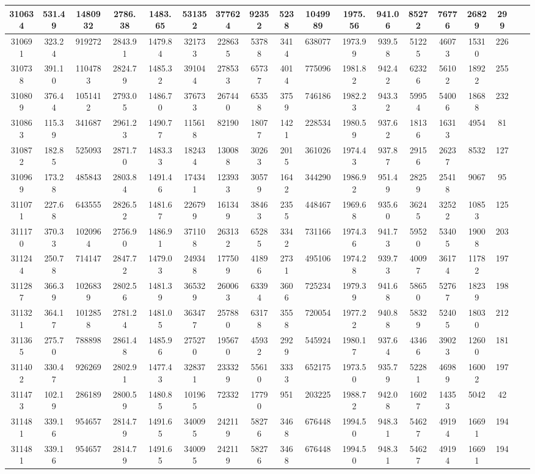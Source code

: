 \documentclass[10pt]{extarticle}
\begin{document}
\begin{longtable}{|c|c|c|c|c|c|c|c|c|c|c|c|c|c|c|c|c|c|}
\hline 
310634&531.49&1480932&2786.38&1483.65&531352&377624&92352&5238&1049989&1975.56&941.06&85272&76776&26829&299 \\ 
\hline 
310691&323.24&919272&2843.91&1479.84&321733&228635&53788&3414&638077&1973.99&939.58&51225&46073&15310&226 \\ 
\hline 
310738&391.10&1104783&2824.79&1485.32&391044&278533&65737&4014&775096&1981.82&942.42&62326&56102&18922&255 \\ 
\hline 
310809&376.44&1051412&2793.05&1486.70&376733&267440&65358&3759&746186&1982.23&943.32&59954&54006&18688&232 \\ 
\hline 
310863&115.39&341687&2961.23&1490.77&115618&82190&18077&1421&228534&1980.59&937.62&18136&16313&4954&81 \\ 
\hline 
310872&182.85&525093&2871.70&1483.33&182434&130088&30263&2015&361026&1974.43&937.87&29156&26237&8532&127 \\ 
\hline 
310969&173.28&485843&2803.84&1491.46&174341&123933&30579&1642&344290&1986.92&951.49&28259&25418&9067&95 \\ 
\hline 
311071&227.68&643555&2826.52&1481.67&226799&161349&38463&2355&448467&1969.68&935.60&36245&32522&10853&125 \\ 
\hline 
311170&370.33&1020964&2756.90&1486.91&371108&263132&65285&3342&731166&1974.36&941.73&59520&53405&19008&203 \\ 
\hline 
311244&250.78&714147&2847.72&1479.03&249348&177509&41896&2731&495106&1974.28&939.73&40097&36174&11782&197 \\ 
\hline 
311287&366.39&1026839&2802.56&1481.39&365329&260063&63394&3606&725234&1979.39&941.68&58650&52767&18239&198 \\ 
\hline 
311321&364.17&1012858&2781.24&1481.05&363477&257880&63178&3558&720054&1977.22&940.88&58329&52405&18030&212 \\ 
\hline 
311365&275.70&788898&2861.48&1485.96&275270&195670&45932&2929&545924&1980.17&937.64&43466&39023&12600&181 \\ 
\hline 
311402&330.47&926269&2802.91&1477.43&328371&233329&55610&3333&652175&1973.50&935.79&52281&46989&16002&197 \\ 
\hline 
311473&102.19&286189&2800.59&1480.85&101965&72332&17790&951&203225&1988.72&942.08&16027&14353&5042&42 \\ 
\hline 
311481&339.16&954657&2814.79&1491.65&340095&242119&58276&3468&676448&1994.50&948.31&54627&49194&16691&194 \\ 
\hline 
311481&339.16&954657&2814.79&1491.65&340095&242119&58276&3468&676448&1994.50&948.31&54627&49194&16691&194 \\ 
\hline 
\end{longtable} 
\end{document}
